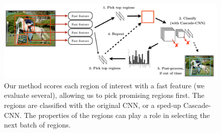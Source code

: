 \begin{figure}[ht]
\begin{center}
\includegraphics[width=0.98\columnwidth]{../ccnn/figures/combined.pdf}
\caption[
Summary of our method for dynamic region selection and cascaded CNN processing.]{
Our method scores each region of interest with a fast feature (we evaluate several), allowing us to pick promising regions first.
The regions are classified with the original CNN, or a sped-up Cascade-CNN.
The properties of the regions can play a role in selecting the next batch of regions.
}\label{fig:combined}
\end{center}
\end{figure}
